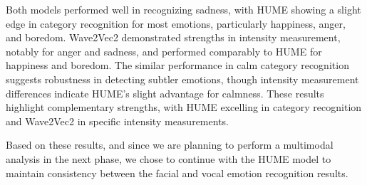 Both models performed well in recognizing sadness, with HUME showing a slight edge in category recognition for most emotions, particularly happiness, anger, and boredom. Wave2Vec2 demonstrated strengths in intensity measurement, notably for anger and sadness, and performed comparably to HUME for happiness and boredom. The similar performance in calm category recognition suggests robustness in detecting subtler emotions, though intensity measurement differences indicate HUME’s slight advantage for calmness. These results highlight complementary strengths, with HUME excelling in category recognition and Wave2Vec2 in specific intensity measurements.

Based on these results, and since we are planning to perform a multimodal analysis in the next phase, we chose to continue with the HUME model to maintain consistency between the facial and vocal emotion recognition results.
